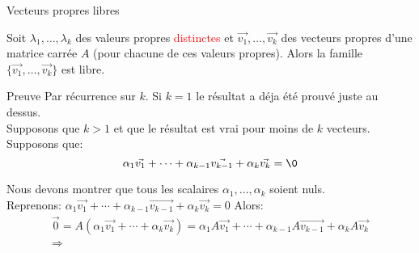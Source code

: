 \begin{parag}{Vecteurs propres libres}
    \begin{theoreme}
    Soit $\lambda_1, \dots, \lambda_k$ des valeurs propres \textcolor{red}{distinctes} et $\vec{v_1}, \dots, \vec{v_k}$ des vecteurs propres d'une matrice carrée $A$ (pour chacune de ces valeurs propres). Alors la famille $\{\vec{v_1}, \dots, \vec{v_k}\}$ est libre.
    \end{theoreme}
    \begin{subparag}{Preuve}
        Par récurrence sur $k$. Si $k = 1$ le résultat a déja été prouvé juste au dessus.
        \\
        Supposons que $k > 1$ et que le résultat est vrai pour moins de $k$ vecteurs. Supposons que:
        \[\alpha_1\vec{v_1} + \cdots + \alpha_{k-1}\vec{v_{k-1}} + \alpha_k\vec{v_k} = \0\]

        Nous devons montrer que tous les scalaires $\alpha_1, \dots, \alpha_k$ soient nuls.\\
        Reprenons: $\alpha_1\vec{v_1} + \cdots + \alpha_{k-1}\vec{v_{k-1}} + \alpha_k\vec{v_k} = 0$ Alors:
        \begin{align*}
            \vec{0} = A(\alpha_1\vec{v_1} + \cdots + \alpha_k\vec{v_k}) = \alpha_1A\vec{v_1} + \cdots + \alpha_{k-1}A\vec{v_{k-1}} + \alpha_kA\vec{v_k}\\
            \Rightarrow 
        \end{align*}
    \end{subparag}
\end{parag}
